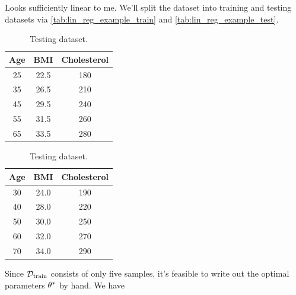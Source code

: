 \documentclass[11pt]{article}
\begin{document}
\noindent Looks sufficiently linear to me. We'll split the dataset into training and testing datasets via \autoref{tab:lin_reg_example_train} and \autoref{tab:lin_reg_example_test}.
\begin{table}[ht]
    \begin{center}
        \begin{minipage}{0.49\textwidth}
            \begin{center}
                \begin{tabular}{c|c||c}
                    Age & BMI & Cholesterol\\
                    \hline
                    \hline
                    25 & 22.5 & 180 \\
                    35 & 26.5 & 210 \\
                    45 & 29.5 & 240 \\
                    55 & 31.5 & 260 \\
                    65 & 33.5 & 280 \\
                    \hline
                \end{tabular}
                \caption{\centering Training dataset.}
                \label{tab:lin_reg_example_train}
            \end{center}
        \end{minipage} \hfill
        \begin{minipage}{0.49\textwidth}
            \begin{center}
                \begin{tabular}{c|c||c}
                    Age & BMI & Cholesterol\\
                    \hline
                    \hline
                    30 & 24.0 & 190 \\
                    40 & 28.0 & 220 \\
                    50 & 30.0 & 250 \\
                    60 & 32.0 & 270 \\
                    70 & 34.0 & 290 \\
                    \hline
                \end{tabular}
                \caption{\centering Testing dataset.}
                \label{tab:lin_reg_example_test}
            \end{center}
        \end{minipage}
    \end{center}
\end{table}
Since $\mathcal{D}_{\text{train}}$ consists of only five samples, it's feasible to write out the optimal parameters $\theta^{*}$ by hand. We have
\end{document}
